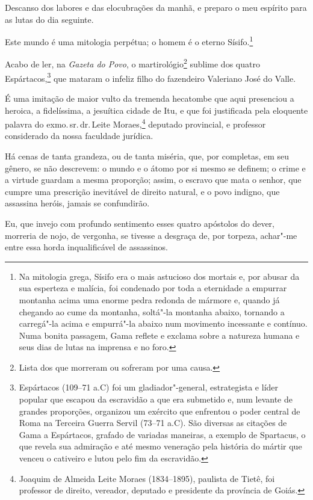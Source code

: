 Descanso dos labores e das elocubrações da manhã, e preparo o meu
espírito para as lutas do dia seguinte.

Este mundo é uma mitologia perpétua; o homem é o eterno Sísifo.\footnote{
  Na mitologia grega, Sísifo era o mais astucioso dos mortais e, por
  abusar da sua esperteza e malícia, foi condenado por toda a eternidade
  a empurrar montanha acima uma enorme pedra redonda de mármore e,
  quando já chegando ao cume da montanha, soltá"-la montanha abaixo,
  tornando a carregá"-la acima e empurrá"-la abaixo num movimento
  incessante e contínuo. Numa bonita passagem, Gama reflete e exclama
  sobre a natureza humana e seus dias de lutas na imprensa e no foro.}

Acabo de ler, na \emph{Gazeta do Povo}, o martirológio\footnote{Lista
  dos que morreram ou sofreram por uma causa.} sublime dos quatro
Espártacos,\footnote{Espártacos (109--71 a.C) foi um \label{espartacos}
  gladiador"-general, estrategista e líder popular que escapou da
  escravidão a que era submetido e, num levante de grandes proporções,
  organizou um exército que enfrentou o poder central de Roma na
  Terceira Guerra Servil (73--71 a.C). São diversas as citações de
  Gama a Espártacos, grafado de variadas maneiras, a exemplo de
  Spartacus, o que revela sua admiração e até mesmo veneração pela
  história do mártir que venceu o cativeiro e lutou pelo fim da
  escravidão.} que mataram o infeliz filho do fazendeiro Valeriano José
do Valle.

É uma imitação de maior vulto da tremenda hecatombe que aqui presenciou
a heroica, a fidelíssima, a jesuítica cidade de Itu, e que foi
justificada pela eloquente palavra do exmo.\,sr.\,dr.\,Leite
Moraes,\footnote{Joaquim de Almeida Leite Moraes (1834--1895), paulista
  de Tietê, foi professor de direito, vereador, deputado e presidente da
  província de Goiás.} deputado provincial, e professor considerado da
nossa faculdade jurídica.

Há cenas de tanta grandeza, ou de tanta miséria, que, por completas, em
seu gênero, se não descrevem: o mundo e o átomo por si mesmo se definem;
o crime e a virtude guardam a mesma proporção; assim, o escravo que mata
o senhor, que cumpre uma prescrição inevitável de direito natural, e o
povo indigno, que assassina heróis, jamais se confundirão.

Eu, que invejo com profundo sentimento esses quatro apóstolos do dever,
morreria de nojo, de vergonha, se tivesse a desgraça de, por torpeza,
achar"-me entre essa horda inqualificável de assassinos.

